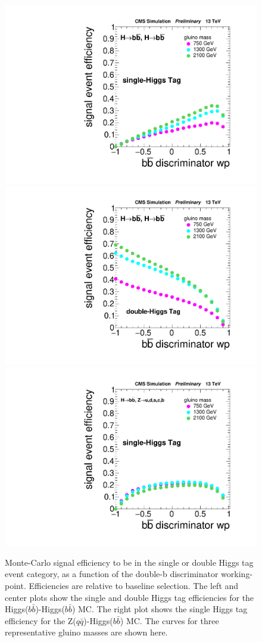 \begin{figure}
  \begin{center}
    \includegraphics[width=0.32\linewidth]{figs/SingleHiggsTagHH.pdf}
    \includegraphics[width=0.32\linewidth]{figs/DoubleHiggsTagHH.pdf}
    \includegraphics[width=0.32\linewidth]{figs/SingleHiggsTagZH.pdf} 
    \caption{
	    Monte-Carlo signal efficiency to be in the single or double Higgs tag event category, as a function of the double-b discriminator working-point.
       Efficiencies are relative to baseline selection.
       The left and center plots show the single and double Higgs tag efficiencies for the Higgs($b\bar{b}$)-Higgs($b\bar{b}$) MC.
       The right plot shows the single Higgs tag efficiency for the Z($q\bar{q}$)-Higgs($b\bar{b}$) MC.
       The curves for three representative gluino masses are shown here.
    }
    \label{fig:HSignalEff}
  \end{center}
\end{figure}





